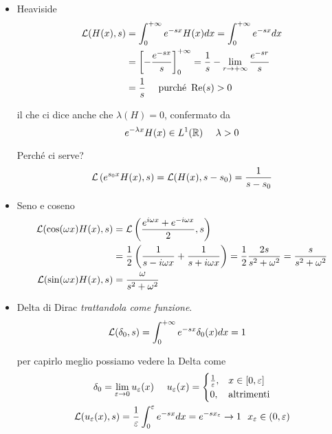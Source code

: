 \begin{itemize}
\item Heaviside
\begin{align*}
\mathcal{L}(H(x), s) & = \int^{+ \infty}_{0} e^{- sx} H(x) dx = \int^{+ \infty}_{0} e^{- sx} dx\\
 & = \left[ - \frac{e^{- sx}}{s}\right]^{+ \infty}_{0} = \frac{1}{s} - \lim_{r\rightarrow + \infty}\frac{e^{- sr}}{s}\\
 & = \frac{1}{s} \ \ \ \ \text{purché} \ \operatorname{Re} (s) > 0
\end{align*}

il che ci dice anche che $\lambda (H) = 0$, confermato da
\begin{equation*}
e^{- \lambda x} H(x) \in L^{1}(\mathbb{R}) \ \ \ \ \lambda > 0
\end{equation*}

Perché ci serve?
\begin{equation*}
\mathcal{L}\left(e^{s_{0} x} H(x), s\right) = \mathcal{L}(H(x), s - s_{0}) = \frac{1}{s - s_{0}}
\end{equation*}
\item Seno e coseno
\begin{align*}
\mathcal{L}(\cos(\omega x) H(x), s) & = \mathcal{L}\left(\frac{e^{i\omega x} + e^{- i\omega x}}{2}, s\right)\\
 & = \frac{1}{2}\left(\frac{1}{s - i\omega x} + \frac{1}{s + i\omega x}\right) = \frac{1}{2}\frac{2s}{s^{2} + \omega^{2}} = \frac{s}{s^{2} + \omega^{2}}\\
\mathcal{L}(\sin(\omega x) H(x), s) & = \frac{\omega}{s^{2} + \omega^{2}}
\end{align*}
\item Delta di Dirac \textit{trattandola come funzione}.
\begin{align*}
\mathcal{L}(\delta_{0}, s) & = \int^{+ \infty}_{0} e^{- sx} \delta_{0}(x) dx = 1
\end{align*}

per capirlo meglio possiamo vedere la Delta come
\begin{gather*}
\delta_{0} = \lim\limits_{\varepsilon \rightarrow 0} u_{\varepsilon}(x) \ \ \ \ u_{\varepsilon}(x) =
\begin{cases}
\frac{1}{\varepsilon}, & x\in [0, \varepsilon]\\
0, & \text{altrimenti}
\end{cases}\\
\mathcal{L}(u_{\varepsilon}(x), s) = \frac{1}{\varepsilon}\int^{\varepsilon}_{0} e^{- sx} dx = e^{- sx_{\varepsilon}}\rightarrow 1\ \ x_{\varepsilon} \in (0, \varepsilon)
\end{gather*}
\end{itemize}
